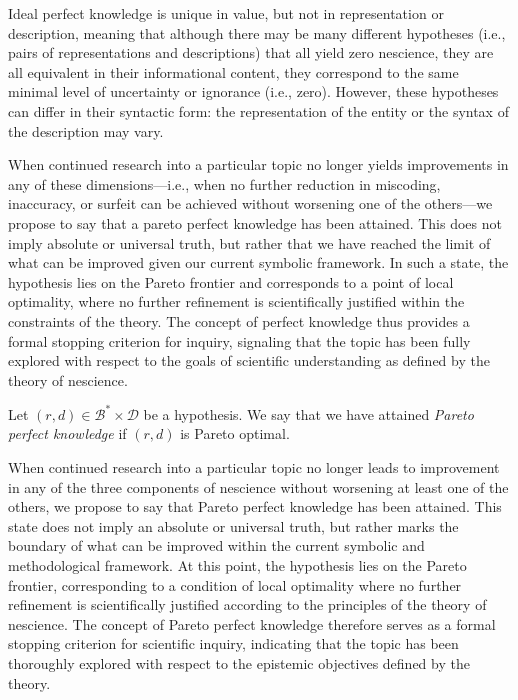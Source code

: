 Ideal perfect knowledge is unique in value, but not in representation or description, meaning that although there may be many different hypotheses (i.e., pairs of representations and descriptions) that all yield zero nescience, they are all equivalent in their informational content, they correspond to the same minimal level of uncertainty or ignorance (i.e., zero). However, these hypotheses can differ in their syntactic form: the representation of the entity or the syntax of the description may vary.

When continued research into a particular topic no longer yields improvements in any of these dimensions—i.e., when no further reduction in miscoding, inaccuracy, or surfeit can be achieved without worsening one of the others—we propose to say that a pareto perfect knowledge has been attained. This does not imply absolute or universal truth, but rather that we have reached the limit of what can be improved given our current symbolic framework. In such a state, the hypothesis lies on the Pareto frontier and corresponds to a point of local optimality, where no further refinement is scientifically justified within the constraints of the theory. The concept of perfect knowledge thus provides a formal stopping criterion for inquiry, signaling that the topic has been fully explored with respect to the goals of scientific understanding as defined by the theory of nescience.

\begin{definition}
Let $(r, d) \in \mathcal{B}^\ast \times \mathcal{D}$ be a hypothesis. We say that we have attained \emph{Pareto perfect knowledge} if $(r, d)$ is Pareto optimal.
\end{definition}

When continued research into a particular topic no longer leads to improvement in any of the three components of nescience without worsening at least one of the others, we propose to say that Pareto perfect knowledge has been attained. This state does not imply an absolute or universal truth, but rather marks the boundary of what can be improved within the current symbolic and methodological framework. At this point, the hypothesis lies on the Pareto frontier, corresponding to a condition of local optimality where no further refinement is scientifically justified according to the principles of the theory of nescience. The concept of Pareto perfect knowledge therefore serves as a formal stopping criterion for scientific inquiry, indicating that the topic has been thoroughly explored with respect to the epistemic objectives defined by the theory.

